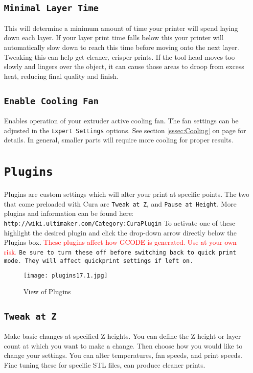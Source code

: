 \subsection{\texttt{Minimal Layer Time}}
This will determine a minimum amount of time your printer will spend laying down each layer. If your layer print time falls below this your printer will automatically slow down to reach this time before moving onto the next layer. Tweaking this can help get cleaner, crisper prints. If the tool head moves too slowly and lingers over the object, it can cause those areas to droop from excess heat, reducing final quality and finish. 

\subsection{\texttt{Enable Cooling Fan}}
Enables operation of your extruder active cooling fan. The fan settings can be adjusted in the \texttt{Expert Settings} options. See section \ref{sssec:Cooling} on page \pageref{sssec:Cooling} for details. In general, smaller parts will require more cooling for proper results. 

\section{\texttt{Plugins}}
Plugins are custom settings which will alter your print at specific points. The two that come preloaded with Cura are \texttt{Tweak at Z}, and \texttt{Pause at Height}. More plugins and information can be found here: \texttt{http://wiki.ultimaker.com/Category:CuraPlugin} To activate one of these highlight the desired plugin and click the drop-down arrow directly below the Plugins box. \textcolor{red}{These plugins affect how GCODE is generated. Use at your own risk.} \texttt{Be sure to turn these off before switching back to quick print mode. They will affect quickprint settings if left on.}

\begin{figure}[H]
\centering
\texttt{[image: plugins17.1.jpg]}
\caption{View of Plugins}
\label{fig:Plugins}
\end{figure}

\subsection{\texttt{Tweak at Z}}
Make basic changes at specified Z heights. You can define the Z height or layer count at which you want to make a change. Then choose how you would like to change your settings. You can alter temperatures, fan speeds, and print speeds. Fine tuning these for specific STL files, can produce cleaner prints.

